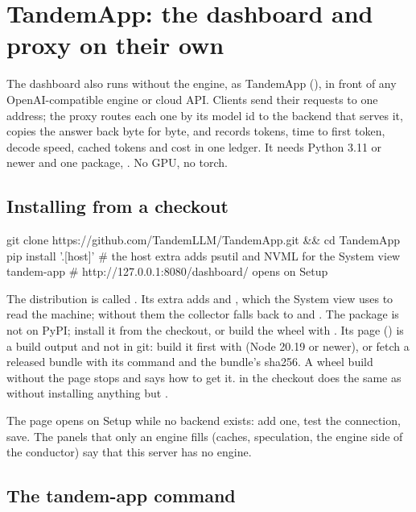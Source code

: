 \chapter{TandemApp: the dashboard and proxy on their own}\label{ch:install-app}

The dashboard also runs without the engine, as TandemApp (), in front of any OpenAI-compatible engine or cloud API. Clients send their requests to one address; the proxy routes each one by its model id to the backend that serves it, copies the answer back byte for byte, and records tokens, time to first token, decode speed, cached tokens and cost in one ledger. It needs Python 3.11 or newer and one package, . No GPU, no torch.

\section{Installing from a checkout}

\begin{shell}
git clone https://github.com/TandemLLM/TandemApp.git && cd TandemApp
pip install '.[host]'  # the host extra adds psutil and NVML for the System view
tandem-app                 # http://127.0.0.1:8080/dashboard/ opens on Setup
\end{shell}

The distribution is called . Its  extra adds  and , which the System view uses to read the machine; without them the collector falls back to  and . The package is not on PyPI; install it from the checkout, or build the wheel with . Its page () is a build output and not in git: build it first with  (Node 20.19 or newer), or fetch a released bundle with its  command and the bundle's sha256. A wheel build without the page stops and says how to get it.  in the checkout does the same as  without installing anything but .

The page opens on Setup while no backend exists: add one, test the connection, save. The panels that only an engine fills (caches, speculation, the engine side of the conductor) say that this server has no engine.

\section{The tandem-app command}

